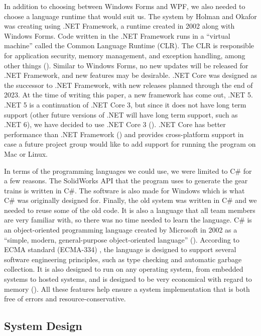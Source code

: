 \begin{doublespace}
In addition to choosing between Windows Forms and WPF, we also needed to choose a language runtime that would suit us. The system by Holman and Okafor was creating using .NET Framework, a runtime created in 2002 along with Windows Forms. Code written in the .NET Framework runs in a ``virtual machine'' called the Common Language Runtime (CLR). The CLR is responsible for application security, memory management, and exception handling, among other things (\cite{wenzel_common_2019}). Similar to Windows Forms, no new updates will be released for .NET Framework, and new features may be desirable. .NET Core was designed as the successor to .NET Framework, with new releases planned through the end of 2023. At the time of writing this paper, a new framework has come out, .NET 5. .NET 5 is a continuation of .NET Core 3, but since it does not have long term support (other future versions of .NET will have long term support, such as .NET 6), we have decided to use .NET Core 3 (\cite{lander_introducing_2019}). .NET Core has better performance than .NET Framework (\cite{toub_performance_2017}) and provides cross-platform support in case a future project group would like to add support for running the program on Mac or Linux.

In terms of the programming languages we could use, we were limited to C\# for a few reasons. The SolidWorks API that the program uses to generate the gear trains is written in C\#. The software is also made for Windows which is what C\# was originally designed for. Finally, the old system was written in C\# and we needed to reuse some of the old code. It is also a language that all team members are very familiar with, so there was no time needed to learn the language. C\# is an object-oriented programming language created by Microsoft in 2002 as a ``simple, modern, general-purpose object-oriented language'' (\cite{kulikov_history_2020}). According to ECMA standard (ECMA-334) , the language is designed to support several software engineering principles, such as type checking and automatic garbage collection. It is also designed to run on any operating system, from embedded systems to hosted systems, and is designed to be very economical with regard to memory (\cite{ecma_international_c_2017}). All these features help ensure a system implementation that is both free of errors and resource-conservative.

\subsection{System Design}


\end{doublespace}
